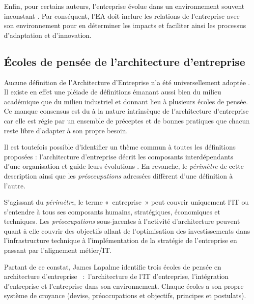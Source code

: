 Enfin, pour certains auteurs, l'entreprise évolue dans un environnement souvent inconstant \cite{lapalme2012three}. Par conséquent, l'EA 
doit inclure les relations de l'entreprise avec son environnement pour en 
déterminer les impacts et faciliter ainsi les processus d'adaptation  et 
d'innovation.


	\subsection{Écoles de pensée de l'architecture d'entreprise} 

Aucune définition de l'Architecture d'Entreprise n'a été universellement adoptée \cite{mentz2012comparison} \cite{ranganathan2005enterprise}. Il existe en effet une pléiade de définitions émanant aussi bien du milieu académique que du milieu industriel et donnant lieu à plusieurs écoles de pensée. Ce manque consensus est du à la nature intrinsèque de l'architecture d'entreprise car elle est régie par un ensemble de préceptes et de bonnes pratiques que chacun reste libre d'adapter à son propre besoin. 

Il est toutefois possible d'identifier un thème commun à toutes les définitions 
proposées : l'architecture d'entreprise décrit les composants interdépendants 
d'une organisation et guide leurs évolutions \cite{lapalme2012three}. En 
revanche, le \textit{périmètre} de cette description ainsi que les \textit{préoccupations} 
adressées diffèrent d'une définition à l'autre.

S'agissant du \textit{périmètre}, le terme «~entreprise~» peut couvrir uniquement l'IT  ou s'entendre à tous ses composants humains, stratégiques, économiques et techniques. Les \textit{préoccupations} sous-jacentes à l'activité d'architecture peuvent quant à elle couvrir des objectifs allant de l'optimisation des investissements dans l'infrastructure technique à l'implémentation de la stratégie de l'entreprise en passant par l'alignement métier/IT. 

Partant de ce constat, James Lapalme identifie trois écoles de pensée en architecture d'entreprise \cite{lapalme2012three}~:~l'architecture de l'IT d'entreprise, l'intégration 
d'entreprise et l'entreprise dans son environnement. Chaque écoles a son 
propre système de croyance (devise, préoccupations et objectifs, principes et 
postulats).



